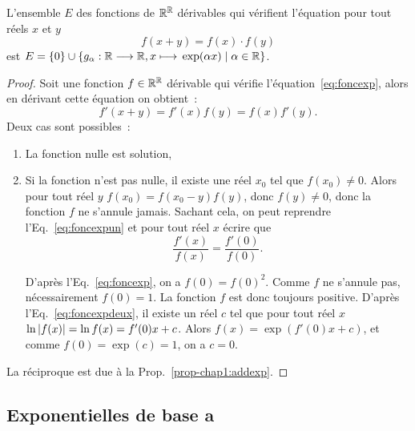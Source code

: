 \begin{theo}
  L'ensemble \(E\) des fonctions de \(\mathbb{R}^{\mathbb{R}}\) dérivables qui vérifient
  l'équation pour tout réels \(x\) et \(y\)
  \begin{equation}\label{eq:foncexp}
    f(x+y) = f(x) \cdot f(y)
  \end{equation}
  est \(E = \left\{0\right\} \cup
  \left\{g_{\alpha}:\mathbb{R} \longrightarrow{} \mathbb{R}, x \longmapsto{} \exp(\alpha x)\mathrel{}\middle|\mathrel{}\alpha \in \mathbb{R}\right\}\).
\end{theo}

\begin{proof}
  Soit une fonction \(f \in \mathbb{R}^{\mathbb{R}}\) dérivable qui vérifie l'équation~\eqref{eq:foncexp},
  alors en dérivant cette équation on obtient~:
  \begin{equation}\label{eq:foncexpun}
    f'(x+y) = f'(x)f(y) = f(x)f'(y).
  \end{equation}
  Deux cas sont possibles~:
  \begin{enumerate}
    \item La fonction nulle est solution,
    \item Si la fonction n'est pas nulle, il existe une réel \(x_0\) tel que
      \(f(x_0) \neq 0\). Alors pour tout réel \(y\) \(f(x_0)= f(x_0-y)f(y)\),
      donc \(f(y) \neq 0\), donc la fonction \(f\) ne s'annule jamais. Sachant
      cela, on peut reprendre l'Eq.~\eqref{eq:foncexpun} et pour tout réel \(x\)
      écrire que           \begin{equation}\label{eq:foncexpdeux}
        \frac{f'(x)}{f(x)} = \frac{f'(0)}{f(0)}.
      \end{equation}

      D'après l'Eq.~\eqref{eq:foncexp}, on a \(f(0) = {f(0)}^2\).
      Comme \(f\) ne s'annule pas, nécessairement \(f(0) = 1\). La fonction
      \(f\) est donc toujours positive. D'après l'Eq.~\eqref{eq:foncexpdeux}, il
      existe un réel \(c\) tel que pour tout réel \(x\) \(\ln \left\lvert f(x)\right\rvert = \ln
      f(x) = f'(0) x + c\). Alors \(f(x) = \exp(f'(0) x +c)\), et comme \(f(0) =
      \exp(c) = 1\), on a \(c = 0\).
  \end{enumerate}

  La réciproque est due à la Prop.~\ref{prop-chap1:addexp}.
\end{proof}

\subsection{Exponentielles de base a}\label{subsec:chap1-expa}

